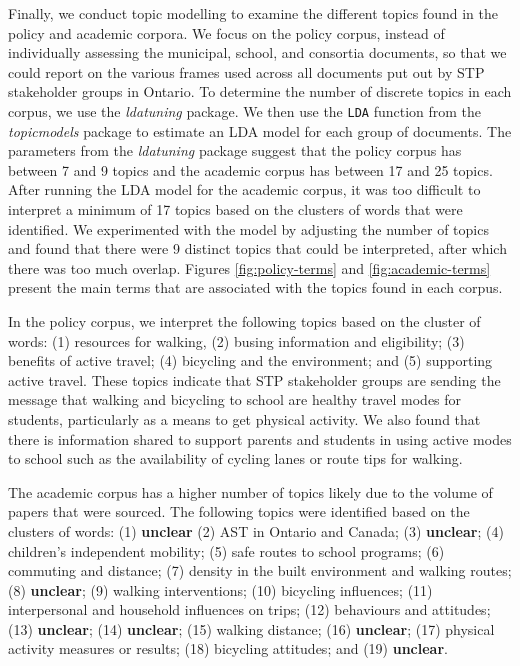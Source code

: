 \documentclass[]{elsarticle} %
\begin{document}
Finally, we conduct topic modelling to examine the different topics
found in the policy and academic corpora. We focus on the policy corpus,
instead of individually assessing the municipal, school, and consortia
documents, so that we could report on the various frames used across all
documents put out by STP stakeholder groups in Ontario. To determine the
number of discrete topics in each corpus, we use the \emph{ldatuning}
package. We then use the \texttt{LDA} function from the
\emph{topicmodels} package to estimate an LDA model for each group of
documents. The parameters from the \emph{ldatuning} package suggest that
the policy corpus has between 7 and 9 topics and the academic corpus has
between 17 and 25 topics. After running the LDA model for the academic
corpus, it was too difficult to interpret a minimum of 17 topics based
on the clusters of words that were identified. We experimented with the
model by adjusting the number of topics and found that there were 9
distinct topics that could be interpreted, after which there was too
much overlap. Figures \ref{fig:policy-terms} and
\ref{fig:academic-terms} present the main terms that are associated with
the topics found in each corpus.

In the policy corpus, we interpret the following topics based on the
cluster of words: (1) resources for walking, (2) busing information and
eligibility; (3) benefits of active travel; (4) bicycling and the
environment; and (5) supporting active travel. These topics indicate
that STP stakeholder groups are sending the message that walking and
bicycling to school are healthy travel modes for students, particularly
as a means to get physical activity. We also found that there is
information shared to support parents and students in using active modes
to school such as the availability of cycling lanes or route tips for
walking.

The academic corpus has a higher number of topics likely due to the
volume of papers that were sourced. The following topics were identified
based on the clusters of words: (1) \textbf{unclear} (2) AST in Ontario
and Canada; (3) \textbf{unclear}; (4) children's independent mobility;
(5) safe routes to school programs; (6) commuting and distance; (7)
density in the built environment and walking routes; (8)
\textbf{unclear}; (9) walking interventions; (10) bicycling influences;
(11) interpersonal and household influences on trips; (12) behaviours
and attitudes; (13) \textbf{unclear}; (14) \textbf{unclear}; (15)
walking distance; (16) \textbf{unclear}; (17) physical activity measures
or results; (18) bicycling attitudes; and (19) \textbf{unclear}.
\end{document}
